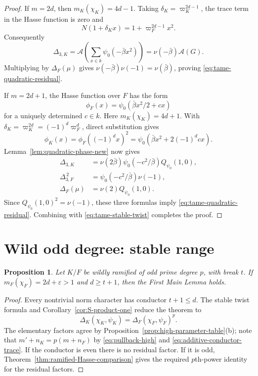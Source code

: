 \documentclass[11pt]{amsart}
\newtheorem{proposition}[theorem]{Proposition}
\theoremstyle{definition}
\theoremstyle{remark}
\newcommand{\Aphase}{\mathcal A}
\begin{document}
\begin{proof}
If $m=2d$, then $m_K(\chi_K)=4d-1$.  Taking
$\delta_K=\varpi_K^{2d-1}$, the trace term in the Hasse function is zero
and
\[
 N(1+\delta_Kx)=1+\varpi_F^{2d-1}x^2.
\]
Consequently
\[
 \Delta_{3,K}=\Aphase\!\left(\sum_{x\in k}\psi_0(-\bar\beta x^2)\right)
 =\nu(-\bar\beta)\Aphase(G).
\]
Multiplying by $\Delta_F(\mu)$ gives
$\nu(-\bar\beta)\nu(-1)=\nu(\bar\beta)$, proving \eqref{eq:tame-quadratic-residual}.

If $m=2d+1$, the Hasse function over $F$ has the form
\[
 \phi_F(x)=\psi_0(\bar\beta x^2/2+cx)
\]
for a uniquely determined $c\in k$.  Here
$m_K(\chi_K)=4d+1$.  With
$\delta_K=\varpi_K^{2d}=(-1)^d\varpi_F^d$, direct substitution gives
\[
 \phi_K(x)=\phi_F((-1)^d x)^2
 =\psi_0(\bar\beta x^2+2(-1)^dcx).
\]
Lemma~\ref{lem:quadratic-phase-new} now gives
\begin{align*}
 \Delta_{3,K}
 &=\nu(2\bar\beta)\psi_0(-c^2/\bar\beta)Q_{\psi_0}(1,0),\\
 \Delta_{3,F}^{\,2}
 &=\psi_0(-c^2/\bar\beta)\nu(-1),\\
 \Delta_F(\mu)&=\nu(2)Q_{\psi_0}(1,0).
\end{align*}
Since $Q_{\psi_0}(1,0)^2=\nu(-1)$, these three formulas imply
\eqref{eq:tame-quadratic-residual}.  Combining with \eqref{eq:tame-stable-twist} completes
the proof.
\end{proof}

\section{Wild odd degree: stable range}

\begin{proposition}\label{prop:wild-stable-new}
Let $K/F$ be wildly ramified of odd prime degree $p$, with break $t$.
If $m_F(\chi_F)=2d+\varepsilon>1$ and $d\geq t+1$, then the First Main
Lemma holds.
\end{proposition}

\begin{proof}
Every nontrivial norm character has conductor $t+1\leq d$.  The stable
twist formula and Corollary~\ref{cor:S-product-one} reduce the theorem to
\[
 \Delta_K(\chi_K,\psi_K)=\Delta_F(\chi_F,\psi_F)^p.
\]
The elementary factors agree by
Proposition~\ref{prop:high-parameter-table}(b); note that
$m'+n_K=p(m+n_F)$ by \eqref{eq:pullback-high} and
\eqref{eq:additive-conductor-trace}.  If the conductor is even there is
no residual factor.  If it is odd,
Theorem~\ref{thm:ramified-Hasse-comparison} gives the required
$p$th-power identity for the residual factors.
\end{proof}
\end{document}
